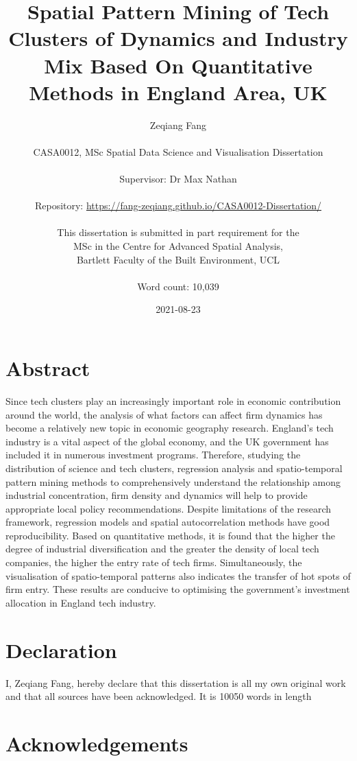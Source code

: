 \documentclass[
  12pt,
  oneside]{book}
\title{Spatial Pattern Mining of Tech Clusters of Dynamics and Industry Mix Based On Quantitative Methods in England Area, UK}
\author{Zeqiang Fang\\
~\\
CASA0012, MSc Spatial Data Science and Visualisation Dissertation\\
~\\
Supervisor: Dr Max Nathan\\
~\\
Repository: \url{https://fang-zeqiang.github.io/CASA0012-Dissertation/}\\
~\\
This dissertation is submitted in part requirement for the\\
MSc in the Centre for Advanced Spatial Analysis,\\
Bartlett Faculty of the Built Environment, UCL\\
~\\
Word count: 10,039}
\date{2021-08-23}
\begin{document}
\maketitle


\hypertarget{abstract}{%
\chapter*{Abstract}\label{abstract}}

Since tech clusters play an increasingly important role in economic contribution around the world, the analysis of what factors can affect firm dynamics has become a relatively new topic in economic geography research. England's tech industry is a vital aspect of the global economy, and the UK government has included it in numerous investment programs. Therefore, studying the distribution of science and tech clusters, regression analysis and spatio-temporal pattern mining methods to comprehensively understand the relationship among industrial concentration, firm density and dynamics will help to provide appropriate local policy recommendations. Despite limitations of the research framework, regression models and spatial autocorrelation methods have good reproducibility. Based on quantitative methods, it is found that the higher the degree of industrial diversification and the greater the density of local tech companies, the higher the entry rate of tech firms. Simultaneously, the visualisation of spatio-temporal patterns also indicates the transfer of hot spots of firm entry. These results are conducive to optimising the government's investment allocation in England tech industry.


\hypertarget{declaration}{%
\chapter*{Declaration}\label{declaration}}

I, Zeqiang Fang, hereby declare that this dissertation is all my own original work and that all sources have been acknowledged. It is 10050 words in length

\hypertarget{acknowledgements}{%
\chapter*{Acknowledgements}\label{acknowledgements}}
\end{document}
